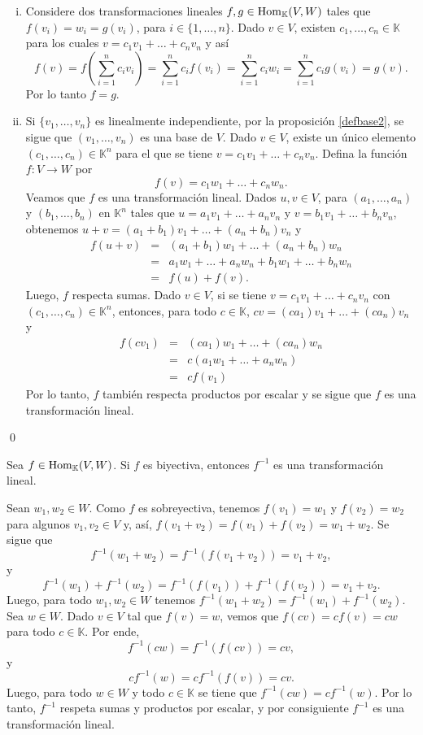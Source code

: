 \dem
\begin{enumerate}[(i)]
\item Considere dos transformaciones lineales $f,g\in\operatorname{Hom}_{\mathbb{K}}(V,W)$ tales que $f(v_i)=w_i=g(v_i)$, para $i\in\{1,\ldots,n\}$. Dado $v\in V$, existen $c_1,\ldots,c_n\in \mathbb{K}$ para los cuales $v=c_1v_1+\ldots+c_nv_n$ y así 
\[
f(v)=f\left(\sum_{i=1}^nc_iv_i\right)=\sum_{i=1}^nc_if(v_i)=\sum_{i=1}^nc_iw_i=\sum_{i=1}^nc_ig(v_i)=g(v).
\]
Por lo tanto $f=g$.
\item Si $\{v_1,\ldots,v_n\}$ es linealmente independiente, por la proposici\'on \ref{defbase2}, se sigue que $(v_1,\ldots,v_n)$ es una base de $V$. Dado $v\in V$, existe un \'unico elemento $(c_1,\ldots, c_n)\in \mathbb{K}^n$ para el que se tiene $v=c_1v_1+\ldots+c_nv_n$. Defina la funci\'on $f:V\rightarrow W$ por
\[
f(v)=c_1w_1+\ldots+c_nw_n.
\]
Veamos que $f$ es una transformaci\'on lineal. Dados $u,v\in V$, para $(a_1,\ldots, a_n)$ y $(b_1,\ldots, b_n)$ en $\mathbb{K}^n$ tales que $u=a_1v_1+\ldots+a_nv_n$ y $v=b_1v_1+\ldots+b_nv_n$, obtenemos $u+v =  (a_1+b_1)v_1+\ldots+(a_n+b_n)v_n$ y
\begin{eqnarray*}
f(u+v) & = & (a_1+b_1)w_1+\ldots+(a_n+b_n)w_n\\
     & = & a_1w_1+\ldots+a_nw_n+ b_1w_1+\ldots+b_nw_n\\
     & = & f(u)+f(v).
\end{eqnarray*} 
Luego, $f$ respecta sumas.
Dado $v\in V$, si se tiene $v=c_1v_1+\ldots+c_nv_n$ con $(c_1,\ldots, c_n)\in \mathbb{K}^n$, entonces, para todo $c\in \mathbb{K}$, $cv = (ca_1)v_1+\ldots+(ca_n)v_n$ y
\begin{eqnarray*}
f(cv_1) & = & (ca_1)w_1+\ldots+(ca_n)w_n\\
     & = & c(a_1w_1+\ldots+a_nw_n)\\
     & = & cf(v_1)
\end{eqnarray*}
Por lo tanto, $f$ tambi\'en respecta productos por escalar y se sigue que $f$ es una transformaci\'on lineal.
\end{enumerate}\qed

\begin{prop}
Sea $f\in\operatorname{Hom}_{\mathbb{K}}(V,W)$. Si $f$ es biyectiva, entonces $f^{-1}$ es una transformaci\'on lineal. 
\end{prop}

\dem Sean $w_1,w_2\in W$. Como $f$ es sobreyectiva, tenemos $f(v_1)=w_1$ y $f(v_2)=w_2$ para algunos $v_1,v_2\in V$ y, as\'i, $f(v_1+v_2)=f(v_1)+f(v_2)=w_1+w_2$. Se sigue que
\[
f^{-1}(w_1+w_2)=f^{-1}\left(f(v_1+v_2)\right)=v_1+v_2,
\] 
y
\[
f^{-1}(w_1)+f^{-1}(w_2)=f^{-1}\left(f(v_1)\right)+f^{-1}\left(f(v_2)\right)=v_1+v_2.
\]
Luego, para todo $w_1,w_2\in W$ tenemos $f^{-1}(w_1+w_2)=f^{-1}(w_1)+f^{-1}(w_2)$.\\
Sea $w\in W$. Dado $v\in V$ tal que $f(v)=w$, vemos que $f(cv)=cf(v)=cw$ para todo $c\in \mathbb{K}$. Por ende,
\[
f^{-1}(cw)=f^{-1}\left(f(cv)\right)=cv,
\]
y
\[
cf^{-1}(w)=cf^{-1}\left(f(v)\right)=cv.
\]
Luego, para todo $w\in W$ y todo $c\in \mathbb{K}$ se tiene que $f^{-1}(cw)=cf^{-1}(w)$. Por lo tanto, $f^{-1}$ respeta sumas y productos por escalar, y por consiguiente $f^{-1}$ es una transformaci\'on lineal.

